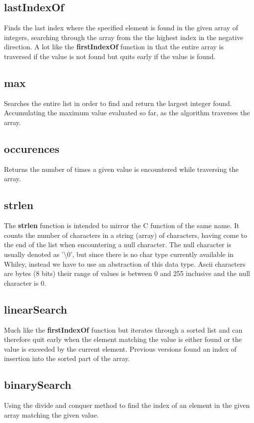 \documentclass[10pt]{article} %
\begin{document}
\subsection{lastIndexOf}
Finds the last index where the specified element is found in the given array of integers, searching through the array from the the highest index in the negative direction. A lot like the  \textbf{firstIndexOf} function in that the entire array is traversed if the value is not found but quits early if the value is found.

\subsection{max}
Searches the entire list in order to find and return the largest integer found. Accumulating the maximum value evaluated so far, as the algorithm traverses the array. 

\subsection{occurences}
Returns the number of times a given value is encountered while traversing the array.

\subsection{strlen}
The \textbf{strlen} function is intended to mirror the C function of the same name. It counts the number of characters in a string (array) of characters, having come to the end of the list when encountering a null character. The null character is usually denoted as '\textbackslash0', but since there is no char type currently available in Whiley, instead we have to use an abstraction of this data type. Ascii characters are bytes (8 bits) their range of values is between 0 and 255 inclusive and the null character is 0.

\subsection{linearSearch}
Much like the  \textbf{firstIndexOf} function but iterates through a sorted list and can therefore quit early when the element matching the value is either found or the value is exceeded by the current element. Previous versions found an index of insertion into the sorted part of the array.

\subsection{binarySearch}
Using the divide and conquer method to find the index of an element in the given array matching the given value.
\end{document}
